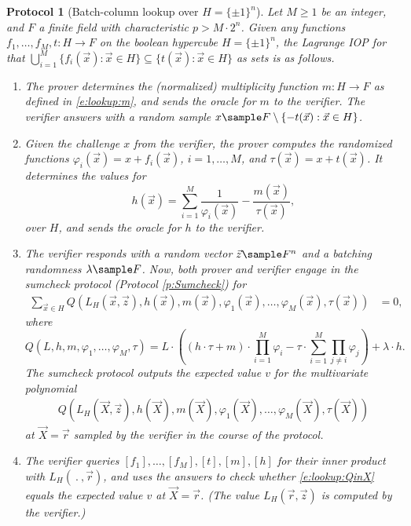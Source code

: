 \documentclass[11pt]{article}
\newtheorem{protocol}[]{Protocol}
\theoremstyle{definition}
\theoremstyle{definition}
\begin{document}
\begin{protocol}[Batch-column lookup over $H=\{\pm 1\}^n$]
\label{prot:lookup}
Let $M\geq 1$ be an integer, and $F$ a finite field with characteristic $p > M\cdot 2^n$. 
Given any functions $f_1, \ldots, f_M, t :H\rightarrow F$ on the boolean hypercube $H=\{\pm 1\}^n$, the Lagrange IOP for that $\bigcup_{i=1}^M\{f_i(\vec x) : \vec x\in H\}\subseteq \{t(\vec x) : \vec x\in H\}$ as sets is as follows.
\begin{enumerate} 
\item
The prover determines the (normalized) multiplicity function $m:H\rightarrow F$ as defined in \eqref{e:lookup:m},
and sends the oracle for $m$ to the verifier.
The verifier answers with a random sample $x\sample F\setminus \{- t(\vec x) : \vec x\in H\}$. 

\item
\label{i:lookup:step1}
Given the challenge $x$ from the verifier, the prover computes the randomized functions $\varphi_i(\vec x) = x + f_i(\vec x)$, $i=1,\ldots, M$, and $\tau(\vec x) =  x + t(\vec x)$.
It determines the values for
\begin{equation}
\label{e:lookup:h:phi}
h(\vec x) = \sum_{i=1}^M \frac{1}{\varphi_i(\vec x)} - \frac{m(\vec x)}{\tau(\vec x)},
\end{equation}
over $H$, and sends the oracle for $h$ to the verifier.

\item
\label{i:lookup:step2}
The verifier responds with a random vector $\vec z \sample F^n$ and a batching randomness $\lambda\sample F$.
Now, both prover and verifier engage in the sumcheck protocol (Protocol \ref{p:Sumcheck}) for 
\begin{align*} 
\sum_{\vec x \in H} Q(L_H(\vec x, \vec z),  h(\vec x), m(\vec x),  \varphi_1(\vec x), \ldots, \varphi_M(\vec x),  \tau(\vec x))&= 0,
\end{align*}
where %
\begin{equation}
\label{e:lookup:Q}
Q(L,h,m, \varphi_1,\ldots, \varphi_M,  \tau) =   
L \cdot \left((h \cdot \tau + m) \cdot \prod_{i=1}^M \varphi_i - \tau\cdot \sum_{i=1}^M \prod_{j\neq i} \varphi_j\right)
+  \lambda \cdot h.
\end{equation}
The sumcheck protocol outputs the expected value $v$ for the multivariate polynomial 
\begin{equation}
\label{e:lookup:QinX}
\begin{aligned}
Q(L_H(\vec X, \vec z), h(\vec X), m(\vec X), \varphi_1(\vec X),\ldots, \varphi_M(\vec X),  \tau(\vec X))
\end{aligned}
\end{equation}
at $\vec X=\vec r$ sampled by the verifier in the course of the protocol.

\item
The verifier queries $[f_1], \ldots, [f_M], [t], [m], [h]$ for their inner product with $L_H(\:.\:,\vec r)$, and uses the answers 
to check whether \eqref{e:lookup:QinX} equals the expected value $v$ at $\vec X = \vec r$. 
(The value $L_H(\vec r, \vec z)$ is computed by the verifier.)
\end{enumerate}
\end{protocol}
\end{document}
